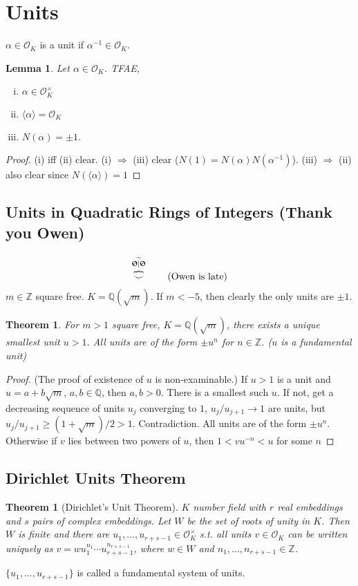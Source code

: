 \documentclass{article}
\theoremstyle{definition}
\theoremstyle{remark}
\theoremstyle{plain}
\newtheorem{lem}[defn]{Lemma}
\newtheorem{thm}[defn]{Theorem}
\newcommand{\ZZ}{\mathbb{Z}}
\newcommand{\QQ}{\mathbb{Q}}
\begin{document}
\section{Units}
$\alpha\in\mathcal O_K$ is a unit if  $\alpha^{-1}\in\mathcal O_K$.
\begin{lem}
    Let $\alpha\in\mathcal O_K$. TFAE,
    \begin{enumerate}[(i)]
        \item $\alpha\in\mathcal O_K^\times$
        \item $\langle\alpha\rangle=\mathcal O_K$
        \item $N(\alpha)=\pm1$.
    \end{enumerate}
\end{lem}
\begin{proof}
    (i) iff (ii) clear. (i) $\Rightarrow$ (iii) clear ($N(1)=N(\alpha)N(\alpha^{-1})$). (iii) $\Rightarrow$ (ii) also clear since $N(\langle\alpha\rangle)=1$
\end{proof}
\subsection{Units in Quadratic Rings of Integers (Thank you Owen)}
\[\overset{\overset{\sim}{\text{\Sun}\vert\text{\Sun}}}{\overset{ \rotatebox[origin=c]{90}{\}}}{\smile}}\tag{Owen is late}\]
$m\in\ZZ$ square free. $K=\QQ(\sqrt m)$. If $m<-5$, then clearly the only units are $\pm 1$.
\begin{thm}
    For $m>1$ square free, $K=\QQ(\sqrt m)$, there exists a unique smallest unit $u>1$. All units are of the form $\pm u^n$ for $n\in\ZZ$. ($u$ is a fundamental unit)
\end{thm}
\begin{proof}
    (The proof of existence of $u$ is non-examinable.)
    If $u>1$ is a unit and $u=a+b\sqrt m$, $a,b\in\QQ$, then $a,b>0$. There is a smallest such $u$. If not, get a decreasing sequence of units $u_j$ converging to $1$, $u_{j}/u_{j+1}\to 1$ are units, but $u_j/u_{j+1}\ge (1+\sqrt m)/2>1$. Contradiction.
    All units are of the form $\pm u^n$. Otherwise if $v$ lies between two powers of $u$, then $1<vu^{-n}<u$ for some $n$
\end{proof}
\subsection{Dirichlet Units Theorem}
\begin{thm}[Dirichlet's Unit Theorem]$K$ number field with $r$ real embeddings and $s$ pairs of complex embeddings. Let $W$ be the set of roots of unity in $K$. Then $W$ is finite and there are $u_1,...,u_{r+s-1}\in\mathcal O_K^\times$ s.t. all units $v\in\mathcal O_K$ can be written uniquely as $v=wu_1^{n_1}\cdots u_{r+s-1}^{n_{r+s-1}}$, where $w\in W$ and $n_1,...,n_{r+s-1}\in\ZZ$.
\end{thm}
$\{u_1,...,u_{r+s-1}\}$ is called a fundamental system of units.
\end{document}
